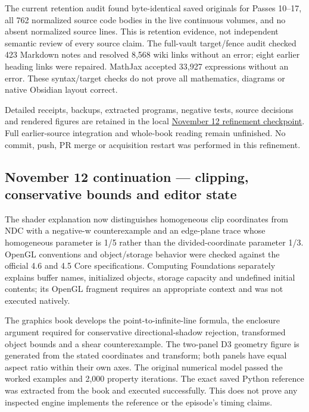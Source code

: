 The current retention audit found byte-identical saved originals for Passes 10--17, all 762 normalized source code bodies in the live continuous volumes, and no absent normalized source lines. This is retention evidence, not independent semantic review of every source claim. The full-vault target/fence audit checked 423 Markdown notes and resolved 8,568 wiki links without an error; eight earlier heading links were repaired. MathJax accepted 33,927 expressions without an error. These syntax/target checks do not prove all mathematics, diagrams or native Obsidian layout correct.

Detailed receipts, backups, extracted programs, negative tests, source decisions and rendered figures are retained in the local \hyperref[source-file-b0877f0cc007b292ac3932b9]{November 12 refinement checkpoint}. Full earlier-source integration and whole-book reading remain unfinished. No commit, push, PR merge or acquisition restart was performed in this refinement.

\subsection{November 12 continuation --- clipping, conservative bounds and editor state}\label{appendix-a103e7846d21-november-12-continuation-clipping-conservative-bounds-and-editor-state}

The shader explanation now distinguishes homogeneous clip coordinates from NDC with a negative-w counterexample and an edge-plane trace whose homogeneous parameter is 1/5 rather than the divided-coordinate parameter 1/3. OpenGL conventions and object/storage behavior were checked against the official 4.6 and 4.5 Core specifications. Computing Foundations separately explains buffer names, initialized objects, storage capacity and undefined initial contents; its OpenGL fragment requires an appropriate context and was not executed natively.

The graphics book develops the point-to-infinite-line formula, the enclosure argument required for conservative directional-shadow rejection, transformed object bounds and a shear counterexample. The two-panel D3 geometry figure is generated from the stated coordinates and transform; both panels have equal aspect ratio within their own axes. The original numerical model passed the worked examples and 2,000 property iterations. The exact saved Python reference was extracted from the book and executed successfully. This does not prove any inspected engine implements the reference or the episode's timing claims.

